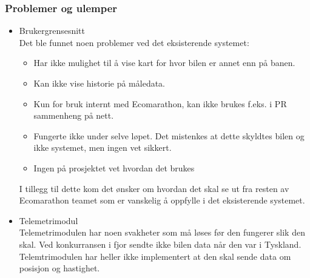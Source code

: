 \subsubsection{Problemer og ulemper}
\begin{itemize}
\item Brukergrensesnitt \\
Det ble funnet noen problemer ved det eksisterende systemet:
\begin{itemize}
\item Har ikke mulighet til å vise kart for hvor bilen er annet enn på banen.
\item Kan ikke vise historie på måledata.
\item Kun for bruk internt med Ecomarathon, kan ikke brukes f.eks. i PR sammenheng på nett.
\item Fungerte ikke under selve løpet. Det mistenkes at dette skyldtes bilen og ikke systemet, men ingen vet sikkert.
\item Ingen på prosjektet vet hvordan det brukes
\end{itemize}
I tillegg til dette kom det ønsker om hvordan det skal se ut fra resten av Ecomarathon teamet som er vanskelig å oppfylle i det eksisterende systemet.
\item Telemetrimodul \\
Telemetrimodulen har noen svakheter som må løses før den fungerer slik den skal.
Ved konkurransen i fjor sendte ikke bilen data når den var i Tyskland.
Telemtrimodulen har heller ikke implementert at den skal sende data om posisjon og hastighet.
\end{itemize}
